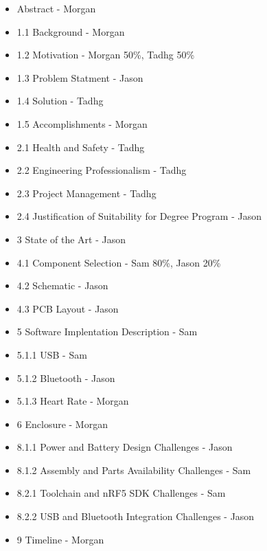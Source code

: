 \begin{itemize}
    \item Abstract - Morgan
    \item 1.1 Background - Morgan
    \item 1.2 Motivation - Morgan 50\%, Tadhg 50\%
    \item 1.3 Problem Statment - Jason
    \item 1.4 Solution - Tadhg
    \item 1.5 Accomplishments - Morgan
    \item 2.1 Health and Safety - Tadhg
    \item 2.2 Engineering Professionalism - Tadhg
    \item 2.3 Project Management - Tadhg
    \item 2.4 Justification of Suitability for Degree Program - Jason
    \item 3 State of the Art - Jason
    \item 4.1 Component Selection - Sam 80\%, Jason 20\%
    \item 4.2 Schematic - Jason
    \item 4.3 PCB Layout - Jason
    \item 5 Software Implentation Description - Sam
    \item 5.1.1 USB - Sam
    \item 5.1.2 Bluetooth - Jason
    \item 5.1.3 Heart Rate - Morgan
    \item 6 Enclosure - Morgan
    \item 8.1.1 Power and Battery Design Challenges - Jason
    \item 8.1.2 Assembly and Parts Availability Challenges - Sam
    \item 8.2.1 Toolchain and nRF5 SDK Challenges - Sam
    \item 8.2.2 USB and Bluetooth Integration Challenges - Jason
    \item 9 Timeline - Morgan
\end{itemize}
